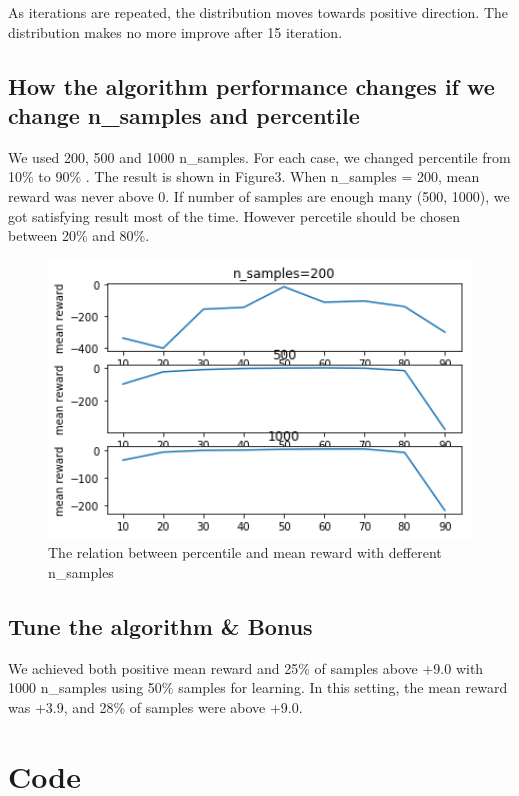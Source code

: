 \documentclass[12pt,a4paper]{scrartcl}
\begin{document}
As iterations are repeated, the distribution moves towards positive direction. The distribution makes no more improve after 15 iteration.

\subsection{How the algorithm performance changes if we change n\_samples and percentile}
We used 200, 500 and 1000 n\_samples. For each case, we changed percentile from 10\% to 90\% . The result is shown in Figure3.
When n\_samples = 200, mean reward was never above 0. If number of samples are enough many (500, 1000), we got satisfying result most of the time. However percetile should be chosen between 20\% and 80\%.


\begin{figure}
	\centering
	\caption{The relation between percentile and mean reward with defferent n\_samples}
    \includegraphics[width=15cm]{result3.png}
\end{figure}

\subsection{Tune the algorithm \& Bonus}
We achieved both positive mean reward and 25\% of samples above +9.0 with 1000 n\_samples using 50\% samples for learning. In this setting, the mean reward was +3.9, and 28\% of samples were above +9.0.


% 

\section{Code}

\end{document}
